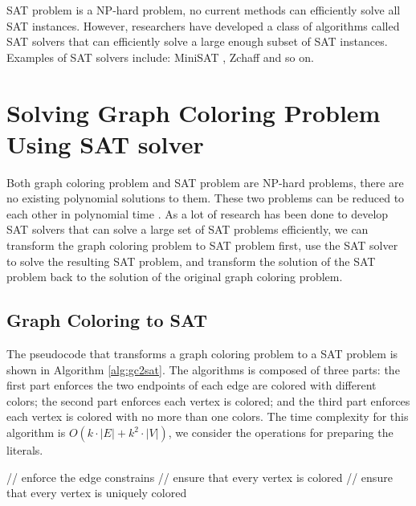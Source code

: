 \documentclass[11pt,letterpaper,oneside]{article}
\begin{document}
SAT problem is a NP-hard problem, no current methods can efficiently solve all SAT instances. However, researchers have developed a class of algorithms called SAT solvers that can efficiently solve a large enough subset of SAT instances. Examples of SAT solvers include: MiniSAT \cite{minisat}, Zchaff \cite{zchaff} and so on.

\section{Solving Graph Coloring Problem Using SAT solver}
\label{sec:implementation}
Both graph coloring problem and SAT problem are NP-hard problems, there are no existing polynomial solutions to them. These two problems can be reduced to each other in polynomial time \cite{reducibility}. As a lot of research has been done to develop SAT solvers that can solve a large set of SAT problems efficiently, we can transform the graph coloring problem to SAT problem first, use the SAT solver to solve the resulting SAT problem, and transform the solution of the SAT problem back to the solution of the original graph coloring problem.

\subsection{Graph Coloring to SAT}
The pseudocode that transforms a graph coloring problem to a SAT problem is shown in Algorithm \ref{alg:gc2sat}. The algorithms is composed of three parts: the first part enforces the two endpoints of each edge are colored with different colors; the second part enforces each vertex is colored; and the third part enforces each vertex is colored with no more than one colors. The time complexity for this algorithm is $O(k\cdot|E|+k^2\cdot|V|)$, we consider the operations for preparing the literals.

\begin{algorithm}[!h]
\DontPrintSemicolon
{}
// enforce the edge constrains\;
// ensure that every vertex is colored\;
// ensure that every vertex is uniquely colored\;
\caption{$\textsc{SAT-from-GC}(graph\ G=(V,E), limit\ k\ colors):$}
\label{alg:gc2sat}
\end{algorithm}
\end{document}
